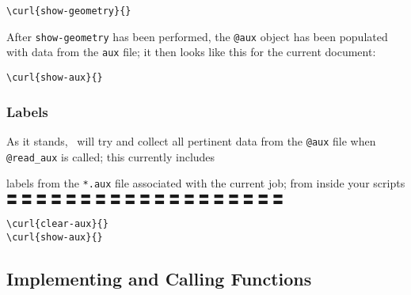 \begin{verbatim}
\curl{show-geometry}{}
\end{verbatim}


After \verb#show-geometry# has been performed, the \verb#@aux# object has been populated with data from the
\verb#aux# file; it then looks like this for the current document:


\begin{verbatim}
\curl{show-aux}{}
\end{verbatim}



\subsubsection{Labels}\label{labels}

As it stands, \CXLTX\ will try and collect all pertinent data from the \verb#@aux# file when
\verb#@read_aux# is called; this currently includes

labels from the \verb#*.aux# file associated with the current job; from
inside your scripts 〓 〓 〓 〓 〓 〓 〓 〓 〓 〓 〓 〓 〓 〓 〓 〓 〓 〓 〓

\begin{verbatim}
\curl{clear-aux}{}
\curl{show-aux}{}
\end{verbatim}


\subsection{Implementing and Calling Functions}\label{functions}

\renewcommand{\CXLTXparameterSplitter}{!}
